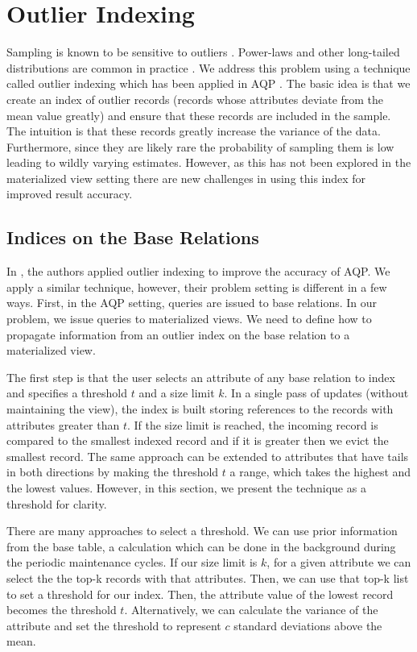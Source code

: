 \vspace{-.5em}
\section{Outlier Indexing}\label{outlier}
Sampling is known to be sensitive to outliers \cite{clauset2009power, chaudhuri2001overcoming}.
Power-laws and other long-tailed distributions are common in practice \cite{clauset2009power}.
We address this problem using a technique called outlier indexing which has been applied in AQP \cite{chaudhuri2001overcoming}.
The basic idea is that we create an index of outlier records (records whose attributes deviate from the mean value greatly) and ensure that these records are included in the sample.
The intuition is that these records greatly increase the variance of the data. 
Furthermore, since they are likely rare the probability of sampling them is low leading to wildly varying estimates.  
However, as this has not been explored in the materialized view setting there are new challenges in using this index for improved result accuracy.

\subsection{Indices on the Base Relations}
In \cite{chaudhuri2001overcoming}, the authors applied outlier indexing to improve the accuracy of AQP.
We apply a similar technique, however, their problem setting is different in a few ways.
First, in the AQP setting, queries are issued to base relations.
In our problem, we issue queries to materialized views.
We need to define how to propagate information from an outlier index on the base relation to a materialized view.

The first step is that the user selects an attribute of any base relation to index and specifies a threshold $t$ and a size limit $k$.
In a single pass of updates (without maintaining the view), the index is built storing references to the records with attributes greater than $t$.
If the size limit is reached, the incoming record is compared to the smallest indexed record and if it is greater then we evict the smallest record.
The same approach can be extended to attributes that have tails in both directions by making the threshold $t$ a range, which takes the highest and the lowest values.
However, in this section, we present the technique as a threshold for clarity.

There are many approaches to select a threshold.
We can use prior information from the base table, a calculation which can be done in the background during the periodic maintenance cycles.
If our size limit is $k$, for a given attribute we can select the the top-k records with that attributes.
Then, we can use that top-k list to set a threshold for our index. 
Then, the attribute value of the lowest record becomes the threshold $t$.
Alternatively, we can calculate the variance of the attribute and set the threshold to represent $c$ standard deviations above the mean.

